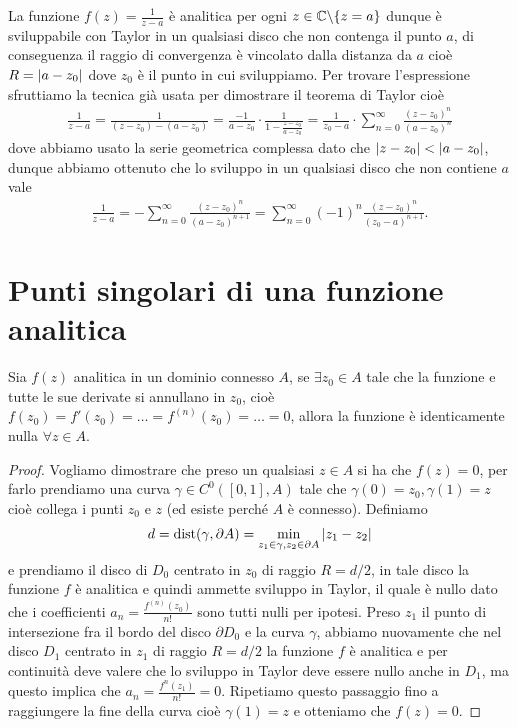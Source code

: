 \begin{example}
  La funzione $ f(z) = \frac1{z - a} $ è analitica per ogni $ z \in \mathbb{C} \backslash \{z = a\} $ dunque è sviluppabile con Taylor in un qualsiasi disco che non 
  contenga il punto $ a $, di conseguenza il raggio di convergenza è vincolato dalla distanza da $ a $ cioè 
  $ R = \left|{ a - z_0}\right| $ dove $ z_0 $ è il punto in cui sviluppiamo. Per trovare l'espressione sfruttiamo la tecnica già usata per dimostrare il 
  teorema di Taylor cioè
  \begin{align}
    \frac1{z - a} = \frac{1}{(z - z_0) - (a - z_0)} = \frac{-1}{a - z_0} \cdot \frac1{1 - \frac{z - z_0}{a - z_0}} 
    = \frac1{z_0 - a} \cdot \sum_{n = 0}^\infty \frac{(z - z_0)^n}{(a - z_0)^n}
  \end{align}
  dove abbiamo usato la serie geometrica complessa dato che $ \left|{z - z_0}\right| < \left|{a - z_0}\right| $, dunque abbiamo ottenuto che lo sviluppo in un 
  qualsiasi disco che non contiene $ a $ vale
  \begin{align}
    \frac{1}{z - a} = -\sum_{n = 0}^\infty \frac{(z - z_0)^n}{(a - z_0)^{n+1}} = \sum_{n = 0}^\infty (-1)^n \frac{(z - z_0)^n}{(z_0 - a)^{n+1}}.
  \end{align}
\end{example}

\section{Punti singolari di una funzione analitica}

\begin{theorem}[  ]
  Sia $ f(z) $ analitica in un dominio connesso $ A $, se $ \exists z_0 \in A $ tale che la funzione e tutte le sue derivate si annullano in $ z_0 $, 
  cioè $ f(z_0) = f'(z_0) = \dots = f^{(n)}(z_0) = \dots = 0 $, allora la funzione è identicamente nulla $ \forall z \in A $.
\end{theorem}
\begin{proof}
  Vogliamo dimostrare che preso un qualsiasi $ z \in A $ si ha che $ f(z) = 0 $, per farlo prendiamo una curva $ \gamma \in C^0([0,1], A) $ tale che 
  $ \gamma(0) = z_0, \gamma(1) = z $ cioè collega i punti $ z_0 $ e $ z $ (ed esiste perché $ A $ è connesso). 
  Definiamo 
  \begin{align}
    d = \textnormal{dist}(\gamma, \partial A) = \min_{z_1 \in \gamma, z_2 \in \partial A} \left|{z_1 - z_2}\right|
  \end{align}
  e prendiamo il disco di $ D_0 $ centrato in $ z_0 $ di raggio $ R = d/2 $, in tale disco la funzione $ f $ è analitica e quindi ammette sviluppo in 
  Taylor, il quale è nullo dato che i coefficienti $ a_n = \frac{f^{(n)}(z_0)}{n!} $ sono tutti nulli per ipotesi. Preso $ z_1 $ il punto di intersezione 
  fra il bordo del disco $ \partial D_0 $ e la curva $ \gamma $, abbiamo nuovamente che nel disco $ D_1 $ centrato in $ z_1 $ di raggio $ R = d/2 $ 
  la funzione $ f $ è analitica e per continuità deve valere che lo sviluppo in Taylor deve essere nullo anche in $ D_1 $, ma questo implica che 
  $ a_n = \frac{f^{n}(z_1)}{n!} = 0 $. Ripetiamo questo passaggio fino a raggiungere la fine della curva cioè $ \gamma(1) = z $ e 
  otteniamo che $ f(z) = 0 $.
\end{proof}

